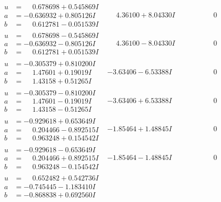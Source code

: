 \documentclass[1p]{elsarticle_modified}
\theoremstyle{definition}
\begin{document}
$$\begin{array}{c|c|c}
\begin{aligned}
u &= \phantom{-}0.678698 + 0.545869 I \\
a &= -0.636932 + 0.805126 I \\
b &= \phantom{-}0.612781 - 0.051539 I\end{aligned}
 & \phantom{-}4.36100 + 8.04330 I & \phantom{-0.000000 } 0 \\ \hline\begin{aligned}
u &= \phantom{-}0.678698 - 0.545869 I \\
a &= -0.636932 - 0.805126 I \\
b &= \phantom{-}0.612781 + 0.051539 I\end{aligned}
 & \phantom{-}4.36100 - 8.04330 I & \phantom{-0.000000 } 0 \\ \hline\begin{aligned}
u &= -0.305379 + 0.810200 I \\
a &= \phantom{-}1.47601 + 0.19019 I \\
b &= \phantom{-}1.43158 + 0.51265 I\end{aligned}
 & -3.63406 - 6.53388 I & \phantom{-0.000000 } 0 \\ \hline\begin{aligned}
u &= -0.305379 - 0.810200 I \\
a &= \phantom{-}1.47601 - 0.19019 I \\
b &= \phantom{-}1.43158 - 0.51265 I\end{aligned}
 & -3.63406 + 6.53388 I & \phantom{-0.000000 } 0 \\ \hline\begin{aligned}
u &= -0.929618 + 0.653649 I \\
a &= \phantom{-}0.204466 - 0.892515 I \\
b &= \phantom{-}0.963248 + 0.154542 I\end{aligned}
 & -1.85464 + 1.48845 I & \phantom{-0.000000 } 0 \\ \hline\begin{aligned}
u &= -0.929618 - 0.653649 I \\
a &= \phantom{-}0.204466 + 0.892515 I \\
b &= \phantom{-}0.963248 - 0.154542 I\end{aligned}
 & -1.85464 - 1.48845 I & \phantom{-0.000000 } 0 \\ \hline\begin{aligned}
u &= \phantom{-}0.652482 + 0.542736 I \\
a &= -0.745445 - 1.183410 I \\
b &= -0.868838 + 0.692560 I\end{aligned}

\end{array}$$
\end{document}
